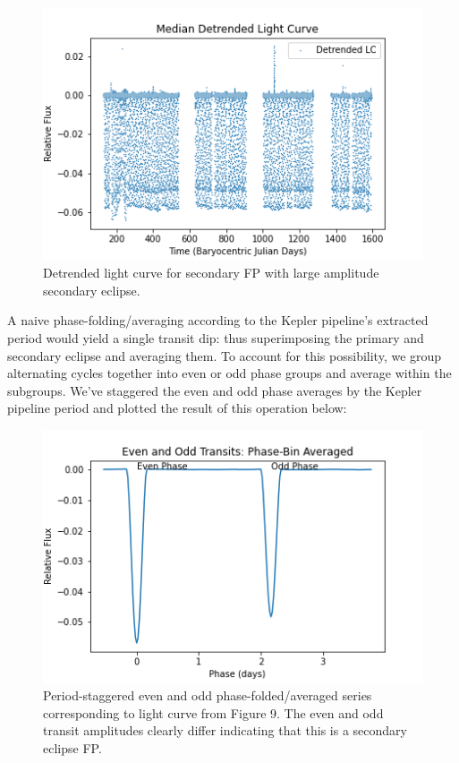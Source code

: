 \documentclass{article}
\begin{document}
 \begin{figure}[H]
	\begin{center}
		\includegraphics[totalheight=5cm]{figures/lc_detrend_secondaryFP_ex2.png}
	\end{center}
	\caption{Detrended light curve for secondary FP with large amplitude secondary eclipse.}
\end{figure}
A naive phase-folding/averaging according to the Kepler pipeline's extracted period would yield a single transit dip: thus superimposing the primary and secondary eclipse and averaging them. To account for this possibility, we group alternating cycles together into even or odd phase groups and average within the subgroups. We've staggered the even and odd phase averages by the Kepler pipeline period and plotted the result of this operation below:
  \begin{figure}[H]
 	\begin{center}
 		\includegraphics[totalheight=5cm]{figures/evenoddstagger_secondaryFP_ex2.png}
 	\end{center}
 	\caption{Period-staggered even and odd phase-folded/averaged series corresponding to light curve from Figure 9. The even and odd transit amplitudes clearly differ indicating that this is a secondary eclipse FP.}
 \end{figure}
\end{document}

